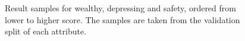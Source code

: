 \begin{figure}[ht]
	\centering
	\hspace{0mm}
	\hspace{0mm}
	\caption[Result samples]{
		Result samples for wealthy, depressing and safety, ordered from lower to higher score.
		The samples are taken from the validation split of each attribute.
		}
	\label{fig:samples_1}
\end{figure}


